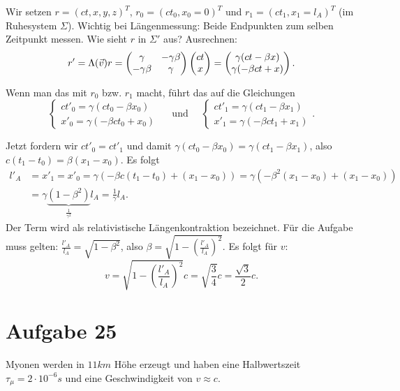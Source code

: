 Wir setzen $r = (ct, x, y, z)^T$, $r_0 = (c t_0, x_0 = 0)^T$ und $r_1 = (c t_1, x_1 = l_A)^T$ (im Ruhesystem $\Sigma$). Wichtig bei Längenmessung: Beide Endpunkten zum selben Zeitpunkt messen. Wie sieht $r$ in $\Sigma'$ aus? Ausrechnen:
\[
	r' = \Lambda(\vec{v}) r = \begin{pmatrix}
		\gamma & -\gamma \beta \\
		-\gamma \beta & \gamma
	\end{pmatrix}
	\begin{pmatrix} ct \\ x \end{pmatrix}
	= \begin{pmatrix}
		\gamma (ct - \beta x) \\
		\gamma (-\beta ct + x)
	\end{pmatrix}
	\text{.}
\]
	
Wenn man das mit $r_0$ bzw. $r_1$ macht, führt das auf die Gleichungen
\[
	\left\{
	\begin{array}{l}
		c t'_0 = \gamma(ct_0 - \beta x_0) \\
		x'_0 = \gamma(-\beta c t_0 + x_0) 	
	\end{array}
	\right.
	\quad \text{ und } \quad
	\left\{
	\begin{array}{l}
		c t'_1 = \gamma(ct_1 - \beta x_1) \\
		x'_1 = \gamma(-\beta c t_1 + x_1) 	
	\end{array}
	\right.
	\text{.}
\]
	
Jetzt fordern wir $c t'_0 = c t'_1$ und damit $\gamma (ct_0 - \beta x_0) = \gamma (c t_1 - \beta x_1)$, also $c (t_1 - t_0) = \beta (x_1 - x_0)$. Es folgt 	
\begin{align*}
	l'_A &= x'_1 = x'_0 = \gamma (- \beta c (t_1 - t_0) + (x_1 - x_0))
	= \gamma (- \beta^2 (x_1 - x_0) + (x_1 - x_0)) \\
	&= \gamma \underbrace{(1 - \beta^2)}_{\frac{1}{\gamma^2}} l_A = \frac{1}{\gamma} l_A
	\text{.}
\end{align*}
Der Term wird als relativistische Längenkontraktion bezeichnet. Für die Aufgabe muss gelten: $\frac{l'_A}{l_A} = \sqrt{1 - \beta^2}$, also $\beta = \sqrt{1 - \left( \frac{l'_A}{l_A} \right)^2}$. Es folgt für $v$:
\[
	v = \sqrt{1 - \left( \frac{l'_A}{l_A} \right)^2} c = \sqrt{\frac{3}{4}} c = \frac{\sqrt{3}}{2} c
		\text{.}
\]

\section*{Aufgabe 25}

Myonen werden in $11 \si{km}$ Höhe erzeugt und haben eine Halbwertszeit $\tau_\mu = 2 \cdot 10^{-6} \si{s}$ und eine Geschwindigkeit von $v \approx c$.

